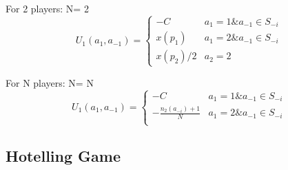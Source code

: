 \documentclass{article}
\begin{document}
For 2 players: N= 2 \\
\[ 
U_1(a_1, a_{-1})= \left\{
  \begin{array}{lr} 
    -C &  a_1 = 1 \& a_{-1} \in S_{-i}\\
    x(p_1) &  a_1 = 2 \& a_{-1} \in S_{-i}\\
    x(p_2)/2 &  a_2 = 2
    \end{array}
\right.
\]

For N players: N= N \\
\[ 
U_1(a_1, a_{-1})= \left\{
  \begin{array}{lr} 
    -C & a_1 = 1 \& a_{-1} \in S_{-i}\\
    - \frac{n_2(a_{-i})+1}{N} & a_1 = 2 \& a_{-1} \in S_{-i} \\
    \end{array}
\right.
\]

\subsection{Hotelling Game}
\end{document}
